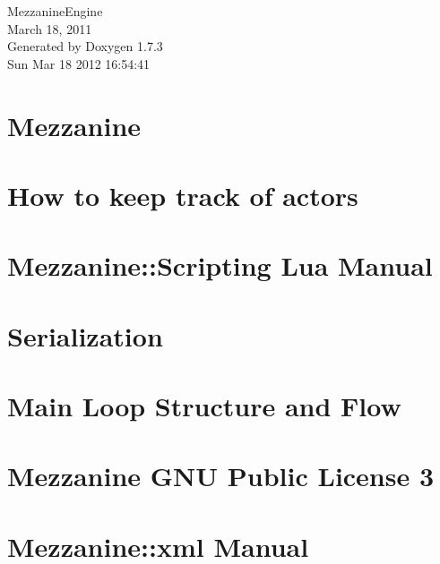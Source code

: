 \documentclass[a4paper]{article}
\begin{document}
\hypersetup{pageanchor=false}
\begin{titlepage}
\vspace*{7cm}
\begin{center}
{\Large MezzanineEngine \\[1ex]\large March 18, 2011 }\\
\vspace*{1cm}
{\large Generated by Doxygen 1.7.3}\\
\vspace*{0.5cm}
{\small Sun Mar 18 2012 16:54:41}\\
\end{center}
\end{titlepage}
\tableofcontents
{}
\hypersetup{pageanchor=true}
\section{Mezzanine}
\label{index}\hypertarget{index}{}
\section{How to keep track of actors}
\label{actorcontainer1}
\hypertarget{actorcontainer1}{}

\section{Mezzanine::Scripting Lua Manual}
\label{LuaManual}
\hypertarget{LuaManual}{}

\section{Serialization}
\label{Serialization}
\hypertarget{Serialization}{}

\section{Main Loop Structure and Flow}
\label{mainloop1}
\hypertarget{mainloop1}{}

\section{Mezzanine GNU Public License 3}
\label{GPLLicense}
\hypertarget{GPLLicense}{}

\section{Mezzanine::xml Manual}
\label{XMLManual}
\hypertarget{XMLManual}{}

\end{document}

